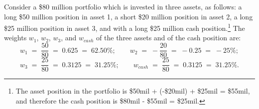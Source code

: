 \begin{examplex}
Consider a \$80 million portfolio which is invested in three assets, as follows: a long
\$50 million position in asset 1, a short \$20 million position in asset 2, a long \$25
million position in asset 3, and with a long \$25 million cash position.\footnote{The
asset position in the portfolio is \$50mil + (-\$20mil) + \$25mil = \$55mil, and
therefore the cash position is \$80mil - \$55mil = \$25mil.} The weights $w_1$, $w_2$,
$w_3$, and $w_{cash}$ of the three assets and of the cash position are:
\[
w_1 \;=\; \frac{50}{80} \;=\; 0.625 \;=\; 62.50\%; \qquad w_2 \;=\; -\frac{20}{80} \;=\;
-0.25 \;=\; -25\%;
\]
\[
w_3 \;=\; \frac{25}{80} \;=\; 0.3125 \;=\; 31.25\%; \qquad w_{cash} \;=\; \frac{25}{80}
\;=\; 0.3125 \;=\; 31.25\%.
\]
\end{examplex}
